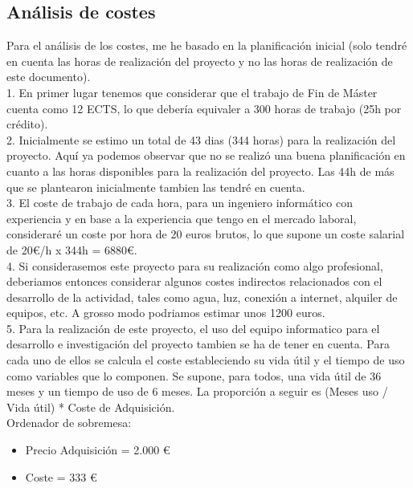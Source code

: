 \begin{titlepage}
\chapter{Análisis de costes}
Para el análisis de los costes, me he basado en la planificación inicial (solo tendré en cuenta las horas de realización del proyecto y no las horas de realización de este documento).\\

1. En primer lugar tenemos que considerar que el trabajo de Fin de Máster cuenta como 12 ECTS, lo que debería equivaler a 300 horas de trabajo (25h por crédito). \\

2. Inicialmente se estimo un total de 43 dias (344 horas) para la realización del proyecto. Aquí ya podemos observar que no se realizó una buena planificación en cuanto a las horas disponibles para la realización del proyecto. Las 44h de más que se plantearon inicialmente tambien las tendré en cuenta.\\

3. El coste de trabajo de cada hora, para un ingeniero informático con experiencia y en base a la experiencia que tengo en el mercado laboral, consideraré un coste por hora de 20 euros brutos, lo que supone un coste salarial de 20\euro /h x 344h = 6880\euro.\\

4. Si considerasemos este proyecto para su realización como algo profesional, deberiamos entonces considerar algunos costes indirectos relacionados con el desarrollo de la actividad, tales como agua, luz, conexión a internet, alquiler de equipos, etc. A grosso modo podriamos estimar unos 1200 euros.\\

5. Para la realización de este proyecto, el uso del equipo informatico para el desarrollo e investigación del proyecto tambien se ha de tener en cuenta. Para cada uno de ellos se calcula el coste estableciendo su vida útil y el tiempo de uso como variables que lo componen. Se supone, para todos, una vida útil de 36 meses y un tiempo de uso de 6 meses. La proporción a seguir es (Meses uso / Vida útil) * Coste de Adquisición.\\

Ordenador de sobremesa: 
\begin{itemize}
	\item Precio Adquisición = 2.000 \euro
	\item Coste = 333 \euro
\end{itemize}


\end{titlepage}

